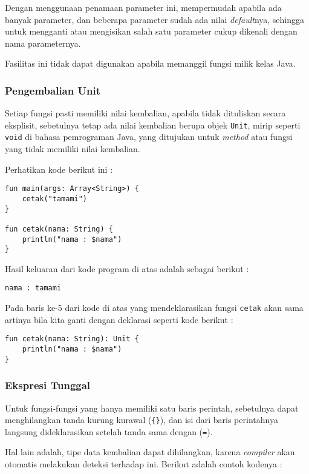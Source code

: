 Dengan menggunaan penamaan parameter ini, mempermudah apabila ada banyak parameter, dan beberapa parameter sudah ada nilai \textit{default}nya, sehingga untuk mengganti atau mengisikan salah satu parameter cukup dikenali dengan nama parameternya.

Fasilitas ini tidak dapat digunakan apabila memanggil fungsi milik kelas Java.

\subsubsection{Pengembalian Unit}

Setiap fungsi pasti memiliki nilai kembalian, apabila tidak dituliskan secara eksplisit, sebetulnya tetap ada nilai kembalian berupa objek \texttt{Unit}, mirip seperti \texttt{void} di bahasa pemrograman Java, yang ditujukan untuk \textit{method} atau fungsi yang tidak memiliki nilai kembalian.

Perhatikan kode berikut ini :

\begin{lstlisting}
fun main(args: Array<String>) {
	cetak("tamami")
}

fun cetak(nama: String) {
	println("nama : $nama")
}
\end{lstlisting}

Hasil keluaran dari kode program di atas adalah sebagai berikut :

\begin{lstlisting}
nama : tamami
\end{lstlisting}

Pada baris ke-5 dari kode di atas yang mendeklarasikan fungsi \texttt{cetak} akan sama artinya bila kita ganti dengan deklarasi seperti kode berikut :

\begin{lstlisting}
fun cetak(nama: String): Unit {
	println("nama : $nama")
}
\end{lstlisting}

\subsubsection{Ekspresi Tunggal}

Untuk fungsi-fungsi yang hanya memiliki satu baris perintah, sebetulnya dapat menghilangkan tanda kurung kurawal (\texttt{\{\}}), dan isi dari baris perintahnya langsung dideklarasikan setelah tanda sama dengan (\texttt{=}).

Hal lain adalah, tipe data kembalian dapat dihilangkan, karena \textit{compiler} akan otomatis melakukan deteksi terhadap ini. Berikut adalah contoh kodenya :

